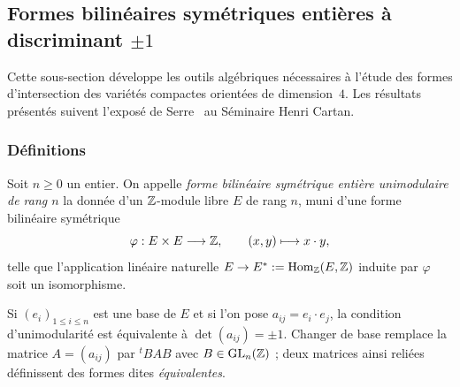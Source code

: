 \subsection{Formes bilinéaires symétriques entières à discriminant $\pm 1$}

Cette sous-section développe les outils algébriques nécessaires à l'étude des formes
d'intersection des variétés compactes orientées de dimension~$4$. Les résultats
présentés suivent l'exposé de Serre~\cite{Serre1962} au Séminaire Henri Cartan.

\subsubsection{Définitions}

\begin{definition}
Soit $n \geq 0$ un entier. On appelle \emph{forme bilinéaire symétrique entière
unimodulaire de rang $n$} la donnée d'un $\mathbb{Z}$-module libre $E$ de rang $n$,
muni d'une forme bilinéaire symétrique
\[
  \varphi : E \times E \longrightarrow \mathbb{Z}, \qquad (x,y) \longmapsto x \cdot y,
\]
telle que l'application linéaire naturelle $E \to E^* := \mathrm{Hom}_{\mathbb{Z}}(E,\mathbb{Z})$
induite par $\varphi$ soit un isomorphisme.
\end{definition}

\begin{proposition}
Si $(e_i)_{1 \leq i \leq n}$ est une base de $E$ et si l'on pose
$a_{ij} = e_i \cdot e_j$, la condition d'unimodularité est équivalente à
$\det(a_{ij}) = \pm 1$.
Changer de base remplace la matrice $A = (a_{ij})$ par ${}^t\!BAB$ avec
$B \in \mathrm{GL}_n(\mathbb{Z})$ ; deux matrices ainsi reliées définissent des formes
dites \emph{équivalentes}.
\end{proposition}

